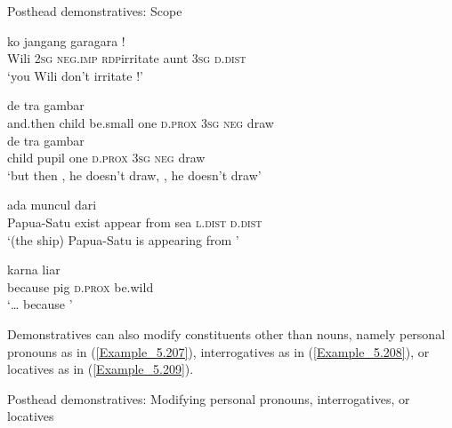 \begin{styleExampleTitle}
Posthead demonstratives: Scope
\end{styleExampleTitle}

\ea
\label{Example_5.203}
 {ko} {jangang} {gara{\Tilde}gara} {} {} {}!\\ %
 Wili  \textsc{2sg}  \textsc{neg.imp}  \textsc{rdp}{\Tilde}irritate  aunt  \textsc{3sg}  \textsc{d.dist}\\
\glt 
‘you Wili don’t irritate !’ \textstyleExampleSource{[081023-001-Cv.0038]}
\z

\ea
\label{Example_5.204}
 {{}} {{}} {{}} {{}} {de} {tra} {gambar}\\ %
 {and.then}  {child}  {be.small}  {one}  {\textsc{d.prox}}  \textsc{3sg}  \textsc{neg}  draw\\
\gll  {}  {}  {}  {}  {de}  tra  {gambar}\\
 child  {pupil}  {one}  {\textsc{d.prox}}  {\textsc{3sg}}  \textsc{neg}  {draw}\\
\glt 
‘but then , he doesn’t draw, , he doesn’t draw’ \textstyleExampleSource{[081109-002-JR.0002]}
\z

\ea
\label{Example_5.205}
 {ada} {muncul} {dari} {} {} {}\\ %
 Papua-Satu  exist  appear  from  sea  \textsc{l.dist}  \textsc{d.dist}\\
\glt 
‘(the ship) Papua-Satu is appearing from \bluebold{)}’ \textstyleExampleSource{[080917-008-NP.0129]}
\z

\ea
\label{Example_5.206}
\gll {{\ldots}} {karna} {} {} {liar}\\ %
 { }   because  pig  \textsc{d.prox}  be.wild\\
\glt 
‘{\ldots} because ’ \textstyleExampleSource{[080919-004-NP.0019]}
\z


Demonstratives can also modify constituents other than nouns, namely personal pronouns as in (\ref{Example_5.207}), interrogatives as in (\ref{Example_5.208}), or locatives as in (\ref{Example_5.209}).


\begin{styleExampleTitle}
Posthead demonstratives: Modifying personal pronouns, interrogatives, or locatives
\end{styleExampleTitle}

